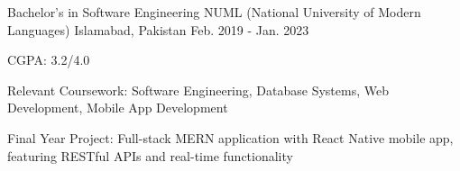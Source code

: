 

\begin{cventries}

  \cventry
    {Bachelor's in Software Engineering} %
    {NUML (National University of Modern Languages)} %
    {Islamabad, Pakistan} %
    {Feb. 2019 - Jan. 2023} %
    {
      \begin{cvitems} %
        \item {CGPA: 3.2/4.0}
        \item {Relevant Coursework: Software Engineering, Database Systems, Web Development, Mobile App Development}
        \item {Final Year Project: Full-stack MERN application with React Native mobile app, featuring RESTful APIs and real-time functionality}
      \end{cvitems}
    }

\end{cventries}
